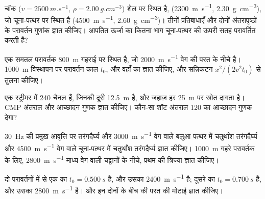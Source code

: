 \begin{exercise}[$\star$]\label{exo:b3:exploration-seismology:1}
चॉक ($v = \qty{2500}{m.s^{-1}}$, $\rho = \qty{2.00}{g.cm^{-3}}$) शेल पर स्थित है,
(\qty{2300}{m.s^{-1}}, \qty{2.30}{g.cm^{-3}}), जो चूना-पत्थर पर स्थित है
(\qty{4500}{m.s^{-1}}, \qty{2.60}{g.cm^{-3}})। तीनों प्रतिबाधाएँ और
दोनों अंतरापृष्ठों के परावर्तन गुणांक ज्ञात कीजिए। आपतित ऊर्जा का कितना भाग
चूना-पत्थर की ऊपरी सतह परावर्तित करती है?
\end{exercise}

\begin{exercise}[$\star$]\label{exo:b3:exploration-seismology:2}
एक समतल परावर्तक \qty{800}{m} गहराई पर स्थित है, जो \qty{2000}{m.s^{-1}} वेग की परत के नीचे है।
\qty{1000}{m} विस्थापन पर परावर्तन काल $t_0$, और वहाँ का  ज्ञात कीजिए, और सन्निकटन $x^2/(2v^2t_0)$ से तुलना कीजिए।
\end{exercise}

\begin{exercise}[$\star$]\label{exo:b3:exploration-seismology:3}
एक स्ट्रीमर में 240 चैनल हैं, जिनकी दूरी \qty{12.5}{m} है, और जहाज़ हर
\qty{25}{m} पर स्रोत दागता है। CMP अंतराल और आच्छादन गुणक ज्ञात कीजिए।
कौन-सा शॉट अंतराल 120 का आच्छादन गुणक देगा?
\end{exercise}

\begin{exercise}[$\star$]\label{exo:b3:exploration-seismology:4}
\qty{30}{Hz} की प्रमुख आवृत्ति पर तरंगदैर्घ्य और
\qty{3000}{m.s^{-1}} वेग वाले बलुआ पत्थर में चतुर्थांश तरंगदैर्घ्य और
\qty{4500}{m.s^{-1}} वेग वाले चूना-पत्थर में चतुर्थांश तरंगदैर्घ्य ज्ञात कीजिए। \qty{1000}{m} गहरे
परावर्तक के लिए, \qty{2800}{m.s^{-1}} माध्य वेग वाली चट्टानों के नीचे, प्रथम  की त्रिज्या ज्ञात कीजिए।
\end{exercise}

\begin{exercise}[$\star\star$]\label{exo:b3:exploration-seismology:5}
दो परावर्तनों में से एक का $t_0 = \qty{0.500}{s}$ है, और उसका 
\qty{2400}{m.s^{-1}} है; दूसरे का $t_0 = \qty{0.700}{s}$ है, और उसका  \qty{2800}{m.s^{-1}} है।
 और इन दोनों के बीच की परत की मोटाई ज्ञात कीजिए।
\end{exercise}

